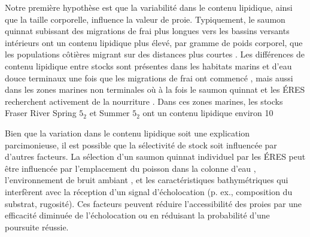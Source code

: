 Notre première hypothèse est que la variabilité dans le contenu lipidique, ainsi que la taille corporelle, influence la valeur de proie. Typiquement, le saumon quinnat subissant des migrations de frai plus longues vers les bassins versants intérieurs ont un contenu lipidique plus élevé, par gramme de poids corporel, que les populations côtières migrant sur des distances plus courtes \citep{quinnBehaviourEcologyPacific2018}. Les différences de contenu lipidique entre stocks sont présentes dans les habitats marins et d'eau douce terminaux une fois que les migrations de frai ont commencé \citep{oneillEnergyContentPacific2014, lernerSeasonalVariationLipid2023}, mais aussi dans les zones marines non terminales où à la fois le saumon quinnat et les ÉRES recherchent activement de la nourriture \citep{hendriksBehaviourMovementReturn2024, freshwaterSeasonalVariabilityCondition2024}. Dans ces zones marines, les stocks Fraser River Spring $5_2$ et Summer $5_2$ ont un contenu lipidique environ 10 %

Bien que la variation dans le contenu lipidique soit une explication parcimonieuse, il est possible que la sélectivité de stock soit influencée par d'autres facteurs. La sélection d'un saumon quinnat individuel par les ÉRES peut être influencée par l'emplacement du poisson dans la colonne d'eau \citep{wrightFinescaleForagingMovements2017}, l'environnement de bruit ambiant \citep{tennessenMalesMissFemales2024}, et les caractéristiques bathymétriques qui interfèrent avec la réception d'un signal d'écholocation (p. ex., composition du substrat, rugosité). Ces facteurs peuvent réduire l'accessibilité des proies par une efficacité diminuée de l'écholocation ou en réduisant la probabilité d'une poursuite réussie.

